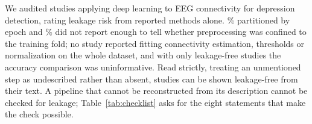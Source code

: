 
We audited \NincludedTotal{} studies applying deep learning to EEG connectivity for depression detection, rating leakage risk from reported methods alone. \PctEpoch\% partitioned by epoch and \PctUnclearAny\% did not report enough to tell whether preprocessing was confined to the training fold; no study reported fitting connectivity estimation, thresholds or normalization on the whole dataset, and with only \NaccFree{} leakage-free studies the accuracy comparison was uninformative. Read strictly, treating an unmentioned step as undescribed rather than absent, \StrictNfree{} studies can be shown leakage-free from their text. A pipeline that cannot be reconstructed from its description cannot be checked for leakage; Table~\ref{tab:checklist} asks for the eight statements that make the check possible.
